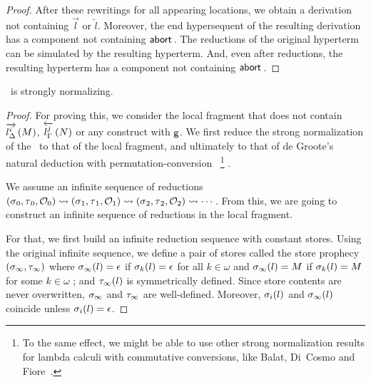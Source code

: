 {\begin{proof}
After these rewritings for all appearing locations,
we obtain a derivation not containing
$\overrightarrow{l}$ or $\overleftarrow{l}$.
Moreover, the end hypersequent of the resulting derivation has a component
not containing $\abort$.
The reductions of the original hyperterm can be simulated by the
resulting hyperterm.  And, even after reductions, the resulting
hyperterm has a component not containing $\abort$.
\end{proof}

\begin{theorem}
 \label{first:sn}
 \lgd\, is strongly normalizing.
\end{theorem}
\begin{proof}
For proving this, we consider the local fragment that does not contain
$\ltor i l \Delta M$, $\rtol j l\Gamma N$ or any construct with $\g$.
We first reduce the strong
normalization of the \lgd\, to that of the local fragment, and
ultimately to that of de Groote's
natural deduction with permutation-conversion~\cite{Philippe2002js}%
\footnote{
To the
same effect, we might be able to use other strong normalization
 results for lambda calculi with commutative conversions, like Balat,
 Di~Cosmo
 and Fiore~\cite{bdf}.
}%
.

We assume an infinite sequence of reductions
$
\conf{_0}{_0}{\hypert_0}
\reduce
\conf{_1}{_1}{\hypert_1}
\reduce
\conf{_2}{_2}{\hypert_2}
\reduce\cdots
$.  From this, we are going to construct an infinite sequence of
reductions in the local fragment.

For that, we first
build an infinite reduction sequence with constant stores.
Using the original infinite sequence, we define a pair of stores called the
store prophecy $(\lstore_\infty, \rstore_\infty)$ where
$ \lstore_\infty(l)= \epsilon$ if $\lstore_k(l)=\epsilon$ for all
 $k\in\omega$ and
$ \lstore_\infty(l)=M $ if $\lstore_k(l)=M$ for some $k\in\omega$
; and $\rstore_\infty(l)$ is symmetrically defined.
Since store contents are never overwritten,
$\lstore_\infty$ and $\rstore_\infty$ are well-defined.
Moreover,
$\lstore_i(l)$ and $\lstore_\infty(l)$ coincide unless
$\lstore_i(l)=\epsilon$.


\end{proof}}
